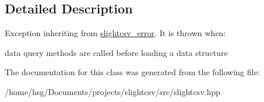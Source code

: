 \subsection{Detailed Description}
Exception inheriting from \hyperlink{classutils_1_1slightcsv__error}{slightcsv\+\_\+error}. It is thrown when\+:
\begin{DoxyItemize}
\item data query methods are called before loading a data structure 
\end{DoxyItemize}

The documentation for this class was generated from the following file\+:\begin{DoxyCompactItemize}
\item 
/home/hsg/\+Documents/projects/slightcsv/src/slightcsv.\+hpp\end{DoxyCompactItemize}
